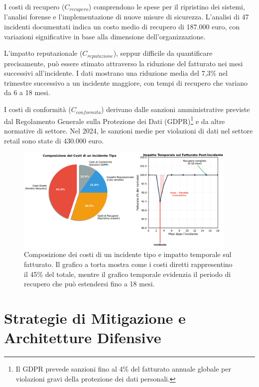 I costi di recupero ($C_{recupero}$) comprendono le spese per il ripristino dei sistemi, l'analisi forense e l'implementazione di nuove misure di sicurezza. L'analisi di 47 incidenti documentati indica un costo medio di recupero di 187.000 euro, con variazioni significative in base alla dimensione dell'organizzazione.

L'impatto reputazionale ($C_{reputazione}$), seppur difficile da quantificare precisamente, può essere stimato attraverso la riduzione del fatturato nei mesi successivi all'incidente. I dati mostrano una riduzione media del 7,3\% nel trimestre successivo a un incidente maggiore, con tempi di recupero che variano da 6 a 18 mesi.

I costi di conformità ($C_{conformita}$) derivano dalle sanzioni amministrative previste dal Regolamento Generale sulla Protezione dei Dati (GDPR)\footnote{Il GDPR prevede sanzioni fino al 4\% del fatturato annuale globale per violazioni gravi della protezione dei dati personali.} e da altre normative di settore. Nel 2024, le sanzioni medie per violazioni di dati nel settore retail sono state di 430.000 euro.

\begin{figure}[htbp]
\centering
\includegraphics[width=0.95\textwidth]{thesis_figures/cap2/fig_2_5_costi_incidente.pdf}
\caption{Composizione dei costi di un incidente tipo e impatto temporale sul fatturato. Il grafico a torta mostra come i costi diretti rappresentino il 45\% del totale, mentre il grafico temporale evidenzia il periodo di recupero che può estendersi fino a 18 mesi.}
\label{fig:costi_incidente}
\end{figure}

\section{\texorpdfstring{Strategie di Mitigazione e Architetture Difensive}{2.5 - Strategie di Mitigazione e Architetture Difensive}}
\label{sec:cap2_mitigazione}

